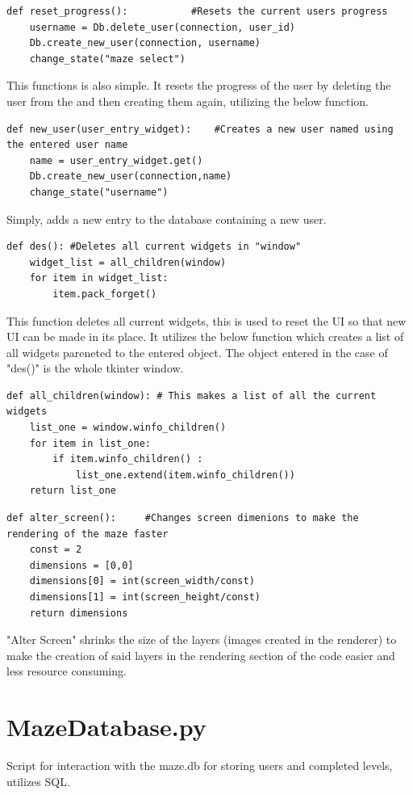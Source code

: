 \documentclass{article}
\begin{document}
\begin{lstlisting}
def reset_progress():           #Resets the current users progress
    username = Db.delete_user(connection, user_id)
    Db.create_new_user(connection, username)
    change_state("maze select")
\end{lstlisting}
This functions is also simple. It resets the progress of the user by deleting the user from the and then creating them again, utilizing the below function.

\begin{lstlisting}
def new_user(user_entry_widget):    #Creates a new user named using the entered user name
    name = user_entry_widget.get()
    Db.create_new_user(connection,name)
    change_state("username")
\end{lstlisting}
Simply, adds a new entry to the database containing a new user.

\clearpage

\begin{lstlisting}
def des(): #Deletes all current widgets in "window"
    widget_list = all_children(window)
    for item in widget_list:
        item.pack_forget()
\end{lstlisting}
This function deletes all current widgets, this is used to reset the UI so that new UI can be made in its place. It utilizes the below function
which creates a list of all widgets pareneted to the entered object. The object entered in the case of "des()"  is the whole tkinter window.
\begin{lstlisting}
def all_children(window): # This makes a list of all the current widgets
    list_one = window.winfo_children()
    for item in list_one:
        if item.winfo_children() :
            list_one.extend(item.winfo_children())
    return list_one
\end{lstlisting}

\begin{lstlisting}
def alter_screen():     #Changes screen dimenions to make the rendering of the maze faster
    const = 2
    dimensions = [0,0]
    dimensions[0] = int(screen_width/const)
    dimensions[1] = int(screen_height/const)
    return dimensions
\end{lstlisting}
"Alter Screen" shrinks the size of the layers (images created in the renderer) to make the creation of said layers in the rendering section of the code easier
and less resource consuming.


\clearpage
\section{MazeDatabase.py}
Script for interaction with the maze.db for storing users and completed levels, utilizes SQL.
\end{document}
